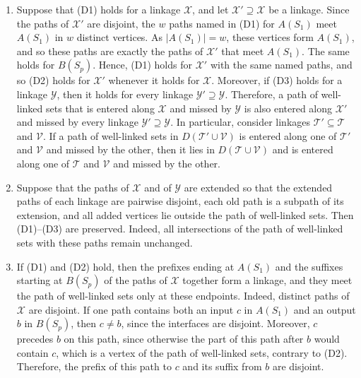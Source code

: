 \documentclass[fontsize=12pt,leading=14pt]{fullpaper}
\newcommand{\Tcal}{\mathcal{T}}
\newcommand{\Vcal}{\mathcal{V}}
\newcommand{\Xcal}{\mathcal{X}}
\newcommand{\Ycal}{\mathcal{Y}}
\begin{document}
\begin{remark}\label{rem:dense-D}
  \begin{enumerate}[label=\textnormal{(\alph*)}]
    \item\label{item:dense-superset} Suppose that (D1) holds for a linkage $\Xcal$, and let $\Xcal'\supseteq\Xcal$ be a linkage.
      Since the paths of $\Xcal'$ are disjoint, the $w$ paths named in (D1) for $A(S_1)$ meet $A(S_1)$ in $w$ distinct vertices.
      As $|A(S_1)|=w$, these vertices form $A(S_1)$, and so these paths are exactly the paths of $\Xcal'$ that meet $A(S_1)$.
      The same holds for $B(S_p)$.
      Hence, (D1) holds for $\Xcal'$ with the same named paths, and so (D2) holds for $\Xcal'$ whenever it holds for $\Xcal$.
      Moreover, if (D3) holds for a linkage $\Ycal$, then it holds for every linkage $\Ycal'\supseteq\Ycal$.
      Therefore, a path of well-linked sets that is entered along $\Xcal$ and missed by $\Ycal$ is also entered along $\Xcal'$ and missed by every linkage $\Ycal'\supseteq\Ycal$.
      In particular, consider linkages $\Tcal'\subseteq\Tcal$ and $\Vcal$.
      If a path of well-linked sets in $D(\Tcal'\cup\Vcal)$ is entered along one of $\Tcal'$ and $\Vcal$ and missed by the other, then it lies in $D(\Tcal\cup\Vcal)$ and is entered along one of $\Tcal$ and $\Vcal$ and missed by the other.
    \item\label{item:dense-extension} Suppose that the paths of $\Xcal$ and of $\Ycal$ are extended so that the extended paths of each linkage are pairwise disjoint, each old path is a subpath of its extension, and all added vertices lie outside the path of well-linked sets.
      Then (D1)--(D3) are preserved.
      Indeed, all intersections of the path of well-linked sets with these paths remain unchanged.
    \item\label{item:dense-ends} If (D1) and (D2) hold, then the prefixes ending at $A(S_1)$ and the suffixes starting at $B(S_p)$ of the paths of $\Xcal$ together form a linkage, and they meet the path of well-linked sets only at these endpoints.
      Indeed, distinct paths of $\Xcal$ are disjoint.
      If one path contains both an input $c$ in $A(S_1)$ and an output $b$ in $B(S_p)$, then $c\ne b$, since the interfaces are disjoint.
      Moreover, $c$ precedes $b$ on this path, since otherwise the part of this path after $b$ would contain $c$, which is a vertex of the path of well-linked sets, contrary to (D2).
      Therefore, the prefix of this path to $c$ and its suffix from $b$ are disjoint.
  \end{enumerate}
\end{remark}
\end{document}
